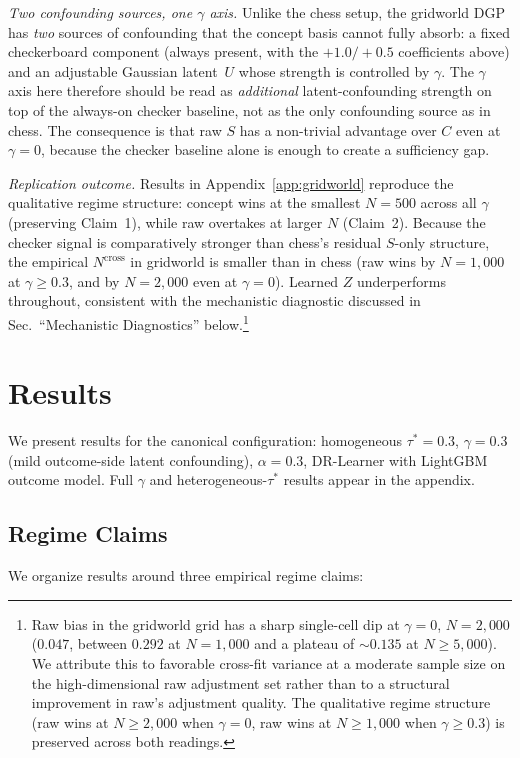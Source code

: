 \documentclass{article}
\begin{document}
\textit{Two confounding sources, one $\gamma$ axis.} Unlike the chess setup, the
gridworld DGP has \emph{two} sources of confounding that the concept basis
cannot fully absorb: a fixed checkerboard component (always present, with the
$+1.0/+0.5$ coefficients above) and an adjustable Gaussian latent~$U$ whose
strength is controlled by $\gamma$. The $\gamma$ axis here therefore should be
read as \emph{additional} latent-confounding strength on top of the always-on
checker baseline, not as the only confounding source as in chess. The
consequence is that raw $S$ has a non-trivial advantage over $C$ even at
$\gamma=0$, because the checker baseline alone is enough to create a sufficiency
gap.

\textit{Replication outcome.} Results in Appendix~\ref{app:gridworld} reproduce
the qualitative regime structure: concept wins at the smallest $N{=}500$ across
all $\gamma$ (preserving Claim~1), while raw overtakes at larger $N$ (Claim~2).
Because the checker signal is comparatively stronger than chess's residual
$S$-only structure, the empirical $N^{\text{cross}}$ in gridworld is smaller
than in chess (raw wins by $N{=}1{,}000$ at $\gamma\geq 0.3$, and by $N{=}2{,}000$
even at $\gamma=0$). Learned $Z$ underperforms throughout, consistent with the
mechanistic diagnostic discussed in Sec.~``Mechanistic Diagnostics''
below.\footnote{Raw bias in the gridworld grid has a sharp single-cell dip at
$\gamma{=}0$, $N{=}2{,}000$ ($0.047$, between $0.292$ at $N{=}1{,}000$ and a
plateau of $\sim\!0.135$ at $N\geq 5{,}000$). We attribute this to favorable
cross-fit variance at a moderate sample size on the high-dimensional raw
adjustment set rather than to a structural improvement in raw's adjustment
quality. The qualitative regime structure (raw wins at $N\geq 2{,}000$ when
$\gamma{=}0$, raw wins at $N\geq 1{,}000$ when $\gamma\geq 0.3$) is preserved
across both readings.}

\section{Results}

We present results for the canonical configuration: homogeneous $\tau^* = 0.3$,
$\gamma = 0.3$ (mild outcome-side latent confounding), $\alpha = 0.3$, DR-Learner
with LightGBM outcome model. Full $\gamma$ and heterogeneous-$\tau^*$ results appear
in the appendix.

\subsection{Regime Claims}
We organize results around three empirical regime claims:
\end{document}

